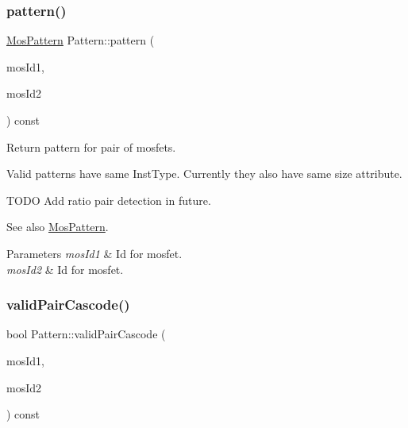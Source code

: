 \subsubsection{\texorpdfstring{pattern()}{pattern()}}
{\footnotesize\ttfamily \hyperlink{type_8h_af19eddb079bfea723256710b029c38e8}{Mos\+Pattern} Pattern\+::pattern (\begin{DoxyParamCaption}\item[{\hyperlink{type_8h_a581e8093e28e7362f2b6937296190676}{Index\+Type}}]{mos\+Id1,  }\item[{\hyperlink{type_8h_a581e8093e28e7362f2b6937296190676}{Index\+Type}}]{mos\+Id2 }\end{DoxyParamCaption}) const}



Return pattern for pair of mosfets. 

Valid patterns have same Inst\+Type. Currently they also have same size attribute.

T\+O\+DO Add ratio pair detection in future. \begin{DoxySeeAlso}{See also}
\hyperlink{type_8h_af19eddb079bfea723256710b029c38e8}{Mos\+Pattern}. 
\end{DoxySeeAlso}

\begin{DoxyParams}{Parameters}
{\em mos\+Id1} & Id for mosfet. \\
\hline
{\em mos\+Id2} & Id for mosfet. \\
\hline
\end{DoxyParams}
\mbox{\label{classPattern_ab1334774aab3ce88b1d2d799e31f3bd9}} 
\subsubsection{\texorpdfstring{valid\+Pair\+Cascode()}{validPairCascode()}}
{\footnotesize\ttfamily bool Pattern\+::valid\+Pair\+Cascode (\begin{DoxyParamCaption}\item[{\hyperlink{type_8h_a581e8093e28e7362f2b6937296190676}{Index\+Type}}]{mos\+Id1,  }\item[{\hyperlink{type_8h_a581e8093e28e7362f2b6937296190676}{Index\+Type}}]{mos\+Id2 }\end{DoxyParamCaption}) const\hspace{0.3cm}{\ttfamily [private]}}



